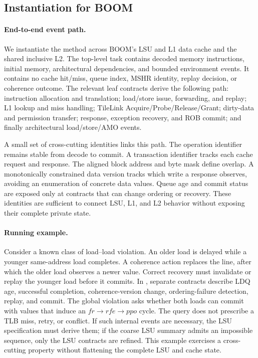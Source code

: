 \subsection{Instantiation for BOOM}
\label{sec:boom-instantiation}

\paragraph{End-to-end event path.}
We instantiate the method across BOOM's LSU and L1 data cache and the shared
inclusive L2.  The top-level task contains decoded memory instructions,
initial memory, architectural dependencies, and bounded environment events.
It contains no cache hit/miss, queue index, MSHR identity, replay decision, or
coherence outcome.  The relevant leaf contracts derive the following path:
instruction allocation and translation; load/store issue, forwarding, and
replay; L1 lookup and miss handling; TileLink Acquire/Probe/Release/Grant;
dirty-data and permission transfer; response, exception recovery, and ROB
commit; and finally architectural load/store/AMO events.

A small set of cross-cutting identities links this path.  The operation
identifier remains stable from decode to commit.  A transaction identifier
tracks each cache request and response.  The aligned block address and byte
mask define overlap.  A monotonically constrained data version tracks which
write a response observes, avoiding an enumeration of concrete data values.
Queue age and commit status are exposed only at contracts that can change
ordering or recovery.  These identities are sufficient to connect LSU, L1,
and L2 behavior without exposing their complete private state.

\paragraph{Running example.}
Consider a known class of load--load violation.  An older load is delayed while
a younger same-address load completes.  A coherence action replaces the line,
after which the older load observes a newer value.  Correct recovery must
invalidate or replay the younger load before it commits.  In \sys{}, separate
contracts describe LDQ age, successful completion, coherence-version change,
ordering-failure detection, replay, and commit.  The global violation asks
whether both loads can commit with values that induce an $fr\rightarrow
rfe\rightarrow ppo$ cycle.  The query does not prescribe a TLB miss, retry, or
conflict.  If such internal events are necessary, the LSU specification must
derive them; if the coarse LSU summary admits an impossible sequence, only the
LSU contracts are refined.  This example exercises a cross-cutting property
without flattening the complete LSU and cache state.

